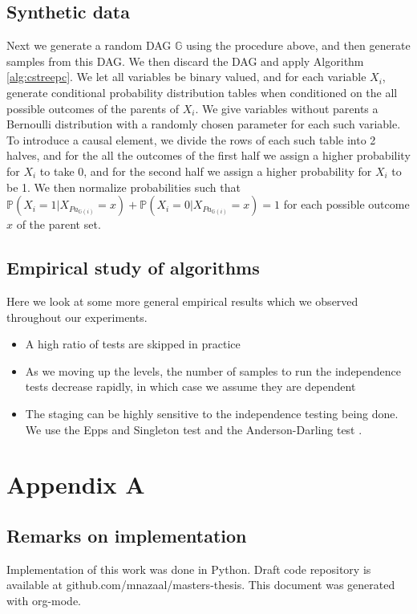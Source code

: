 \documentclass{tufte-book}
\begin{document}
\section{Synthetic data}
\label{sec:orgbca246e}
Next we generate a random DAG \(\mathbb{G}\) using the procedure above, and then generate samples from this DAG. We then discard the DAG and apply Algorithm \ref{alg:cstreepc}. We let all variables be binary valued, and for each variable \(X_i\), generate conditional probability distribution tables when conditioned on the all possible outcomes of the parents of \(X_i\). We give variables without parents a Bernoulli distribution with a randomly chosen parameter for each such variable. To introduce a causal element, we divide the rows of each such table into 2 halves, and for the all the outcomes of the first half we assign a higher probability for \(X_i\) to take 0, and for the second half we assign a higher probability for \(X_i\) to be 1. We then normalize probabilities such that \(\mathbb{P}(X_i=1|X_{Pa_{\mathbb{G}(i)}}=x)+\mathbb{P}(X_i=0|X_{Pa_{\mathbb{G}(i)}}=x)=1\) for each possible outcome \(x\) of the parent set.


\section{Empirical study of algorithms}
\label{sec:orgb435aaa}
Here we look at some more general empirical results which we observed throughout our experiments.
\begin{itemize}
\item A high ratio of tests are skipped in practice
\item As we moving up the levels, the number of samples to run the independence tests decrease rapidly, in which case we assume they are dependent
\item The staging can be highly sensitive to the independence testing being done. We use the Epps and Singleton test \cite{epps-1986-omnib-test,goerg-2009-nonpar-testin} and the  Anderson-Darling test \cite{scholz-1987-k-sampl}.
\end{itemize}



 \newpage 






 \newpage 

\chapter{Appendix A}
\label{sec:org3e58cd9}
\section{Remarks on implementation}
\label{sec:org2964741}
Implementation of this work was done in Python. Draft code repository is available at github.com/mnazaal/masters-thesis. This document was generated with org-mode.
\end{document}
